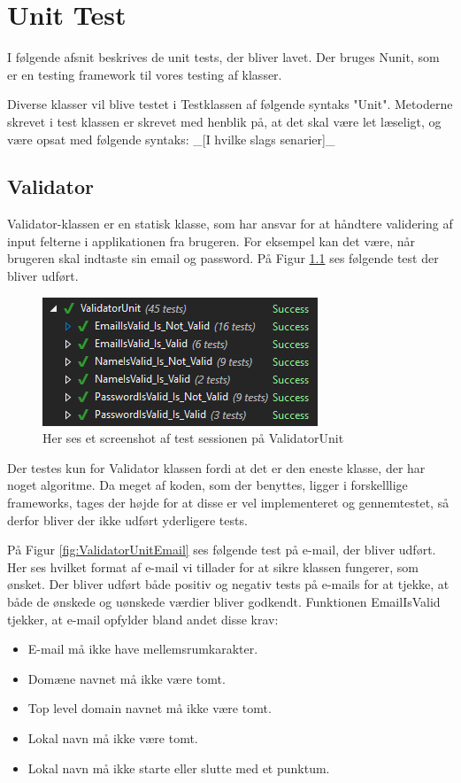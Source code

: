 \chapter{Unit Test}
I følgende afsnit beskrives de unit tests,  der bliver lavet. Der bruges Nunit\cite{NUnit}, som er en testing framework til vores testing af klasser. 

Diverse klasser vil blive testet i Testklassen af følgende syntaks "Unit". Metoderne skrevet i test klassen er skrevet med henblik på, at det skal være let læseligt, og være opsat med følgende syntaks: 
\_[I hvilke slags senarier]\_ 

\section{Validator}
Validator-klassen er en statisk klasse, som har ansvar for at håndtere validering af input felterne i applikationen fra brugeren. For eksempel kan det være, når brugeren skal indtaste sin email og password. På Figur \ref{fig:ValidatorUnit} ses følgende test der bliver udført.
\begin{figure}[H]
	\centering
	\includegraphics[width=0.6\linewidth]{Unit/ValidatorUnit.PNG}
	\caption{Her ses et screenshot af test sessionen på ValidatorUnit}
	\label{fig:ValidatorUnit}
\end{figure}
 Der testes kun for Validator klassen fordi at det er den eneste klasse, der har noget algoritme. Da meget af koden, som der benyttes, ligger i forskelllige frameworks, tages der højde for at disse er vel implementeret og gennemtestet, så derfor bliver der ikke udført yderligere tests. 
\clearpage

På Figur \ref{fig:ValidatorUnitEmail} ses følgende test på e-mail, der bliver udført. Her ses hvilket format af e-mail vi tillader for at sikre klassen fungerer, som ønsket.
Der bliver udført både positiv og negativ tests på e-mails for at tjekke, at både de ønskede og uønskede værdier bliver godkendt. Funktionen EmailIsValid tjekker, at e-mail opfylder bland andet disse krav:\\
\begin{itemize}
	\item E-mail må ikke have mellemsrumkarakter.
	\item Domæne navnet må ikke være tomt.
	\item Top level domain navnet\cite{TLD} må ikke være tomt.
	\item Lokal navn må ikke være tomt.
	\item Lokal navn må ikke starte eller slutte med et punktum.	
\end{itemize}

